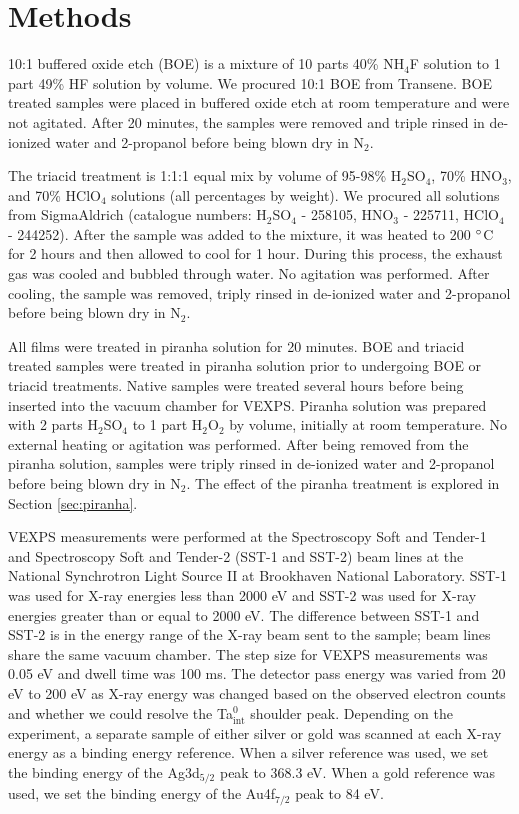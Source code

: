 \documentclass{WileyMSP-template}
\begin{document}
\section{Methods} \label{sec:methods}

10:1 buffered oxide etch (BOE) is a mixture of 10 parts 40\% NH$_4$F solution to 1 part 49\% HF solution by volume. We procured 10:1 BOE from Transene. BOE treated samples were placed in buffered oxide etch at room temperature and were not agitated. After 20 minutes, the samples were removed and triple rinsed in de-ionized water and 2-propanol before being blown dry in N$_2$.

The triacid treatment is 1:1:1 equal mix by volume of 95-98\% H$_2$SO$_4$, 70\% HNO$_3$, and 70\% HClO$_4$ solutions (all percentages by weight). We procured all solutions from SigmaAldrich (catalogue numbers: H$_2$SO$_4$ - 258105, HNO$_3$ - 225711, HClO$_4$ - 244252). After the sample was added to the mixture, it was heated to 200 $\degree$C for 2 hours and then allowed to cool for 1 hour. During this process, the exhaust gas was cooled and bubbled through water. No agitation was performed. After cooling, the sample was removed, triply rinsed in de-ionized water and 2-propanol before being blown dry in N$_2$.

All films were treated in piranha solution for 20 minutes. BOE and triacid treated samples were treated in piranha solution prior to undergoing BOE or triacid treatments. Native samples were treated several hours before being inserted into the vacuum chamber for VEXPS. Piranha solution was prepared with 2 parts H$_2$SO$_4$ to 1 part H$_2$O$_2$ by volume, initially at room temperature. No external heating or agitation was performed. After being removed from the piranha solution, samples were triply rinsed in de-ionized water and 2-propanol before being blown dry in N$_2$. The effect of the piranha treatment is explored in Section \ref{sec:piranha}.

VEXPS measurements were performed at the Spectroscopy Soft and Tender-1 and Spectroscopy Soft and Tender-2 (SST-1 and SST-2) beam lines at the National Synchrotron Light Source II at Brookhaven National Laboratory. SST-1 was used for X-ray energies less than 2000 eV and SST-2 was used for X-ray energies greater than or equal to 2000 eV. The difference between SST-1 and SST-2 is in the energy range of the X-ray beam sent to the sample; beam lines share the same vacuum chamber. The step size for VEXPS measurements was 0.05 eV and dwell time was 100 ms. The detector pass energy was varied from 20 eV to 200 eV as X-ray energy was changed based on the observed electron counts and whether we could resolve the Ta$^0_\text{int}$ shoulder peak. Depending on the experiment, a separate sample of either silver or gold was scanned at each X-ray energy as a binding energy reference. When a silver reference was used, we set the binding energy of the Ag3d$_{5/2}$ peak to 368.3 eV. When a gold reference was used, we set the binding energy of the Au4f$_{7/2}$ peak to 84 eV.
\end{document}
